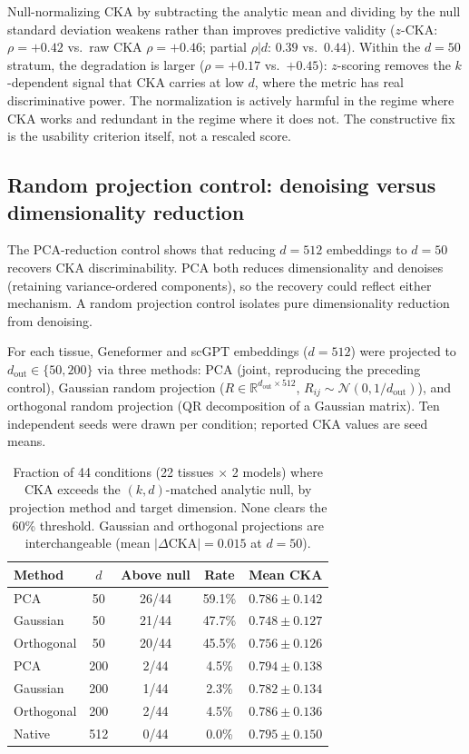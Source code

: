 \documentclass[11pt]{article}
\newcommand{\R}{\mathbb{R}}
\begin{document}
Null-normalizing CKA by subtracting the analytic mean and dividing by
the null standard deviation weakens rather than improves predictive
validity ($z$-CKA: $\rho = +0.42$ vs.\ raw CKA $\rho = +0.46$;
partial $\rho|d$: $0.39$ vs.\ $0.44$). Within the $d = 50$ stratum,
the degradation is larger ($\rho = +0.17$ vs.\ $+0.45$): $z$-scoring
removes the $k$-dependent signal that CKA carries at low $d$, where the
metric has real discriminative power. The normalization is actively
harmful in the regime where CKA works and redundant in the regime where
it does not. The constructive fix is the usability criterion itself,
not a rescaled score.


\subsection{Random projection control: denoising versus dimensionality reduction}
\label{sec:randproj}

The PCA-reduction control shows that reducing $d = 512$ embeddings to
$d = 50$ recovers CKA discriminability. PCA both reduces dimensionality
and denoises (retaining variance-ordered components), so the recovery
could reflect either mechanism. A random projection control isolates
pure dimensionality reduction from denoising.

For each tissue, Geneformer and scGPT embeddings ($d = 512$) were
projected to $d_{\mathrm{out}} \in \{50, 200\}$ via three methods:
PCA (joint, reproducing the preceding control), Gaussian random
projection ($R \in \R^{d_{\mathrm{out}} \times 512}$,
$R_{ij} \sim \mathcal{N}(0, 1/d_{\mathrm{out}})$), and orthogonal
random projection (QR decomposition of a Gaussian matrix). Ten
independent seeds were drawn per condition; reported CKA values are
seed means.

\begin{table}[t]
\centering
\caption{Fraction of 44 conditions (22 tissues $\times$ 2 models) where
CKA exceeds the $(k, d)$-matched analytic null, by projection method and
target dimension. None clears the 60\% threshold.
Gaussian and orthogonal projections are interchangeable (mean
$|\Delta\text{CKA}| = 0.015$ at $d = 50$).}
\label{tab:randproj}
\small
\begin{tabular}{@{}lcccc@{}}
\toprule
Method & $d$ & Above null & Rate & Mean CKA \\
\midrule
PCA              & 50  & 26/44 & 59.1\% & $0.786 \pm 0.142$ \\
Gaussian         & 50  & 21/44 & 47.7\% & $0.748 \pm 0.127$ \\
Orthogonal       & 50  & 20/44 & 45.5\% & $0.756 \pm 0.126$ \\
\midrule
PCA              & 200 &  2/44 &  4.5\% & $0.794 \pm 0.138$ \\
Gaussian         & 200 &  1/44 &  2.3\% & $0.782 \pm 0.134$ \\
Orthogonal       & 200 &  2/44 &  4.5\% & $0.786 \pm 0.136$ \\
\midrule
Native           & 512 &  0/44 &  0.0\% & $0.795 \pm 0.150$ \\
\bottomrule
\end{tabular}
\end{table}
\end{document}
